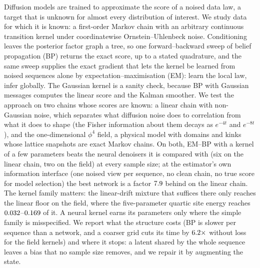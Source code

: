 Diffusion models are trained to approximate the score of a noised data law, a target that is
unknown for almost every distribution of interest. We study data for which it is known: a
first-order Markov chain with an arbitrary continuous transition kernel under coordinatewise
Ornstein--Uhlenbeck noise. Conditioning leaves the posterior factor graph a tree, so one
forward--backward sweep of belief propagation (BP) returns the exact score, up to a stated
quadrature, and the same sweep supplies the exact gradient that lets the kernel be learned from
noised sequences alone by expectation--maximisation (EM): learn the local law, infer globally.
The Gaussian kernel is a sanity check, because BP with Gaussian messages computes the linear
score and the Kalman smoother. We test the approach on two chains whose scores are known:
a linear chain with non-Gaussian noise, which separates what diffusion noise does to
correlation from what it does to shape (the Fisher information about them decays as $e^{-4t}$
and $e^{-8t}$), and the one-dimensional $\phi^4$ field, a physical model with domains and
kinks whose lattice snapshots are exact Markov chains. On both, EM--BP with a kernel of a few parameters beats the neural denoisers it is compared with (six on the linear chain, two on
the field) at every sample size; at the estimator's own information interface (one noised view per sequence, no clean chain, no true score
for model selection) the best network is a factor $7.9$ behind on the linear chain. The kernel family
matters: the linear-drift mixture that suffices there only reaches the linear floor on the field,
where the five-parameter quartic site energy reaches $0.032$--$0.169$ of it.
A neural kernel earns its parameters only where the simple family is misspecified. We report
what the structure costs (BP is slower per sequence than a network, and a coarser grid cuts its time
by $6.2\times$ without loss for the field kernels) and where it stops: a
latent shared by the whole sequence leaves a bias that no sample size removes, and we repair it
by augmenting the state.
